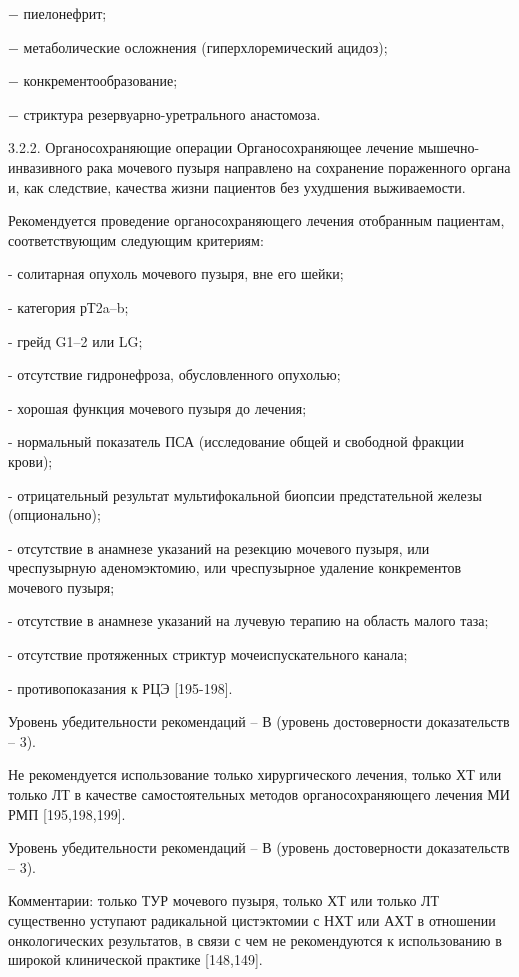 − пиелонефрит;

− метаболические осложнения (гиперхлоремический ацидоз);

− конкрементообразование;

− стриктура резервуарно-уретрального анастомоза.

3.2.2. Органосохраняющие операции
Органосохраняющее лечение мышечно-инвазивного рака мочевого пузыря направлено на сохранение пораженного органа и, как следствие, качества жизни пациентов без ухудшения выживаемости.

Рекомендуется проведение органосохраняющего лечения отобранным пациентам, соответствующим следующим критериям:

- солитарная опухоль мочевого пузыря, вне его шейки;

- категория рТ2a–b;

- грейд G1–2 или LG;

- отсутствие гидронефроза, обусловленного опухолью;

- хорошая функция мочевого пузыря до лечения;

- нормальный показатель ПСА (исследование общей и свободной фракции крови);

- отрицательный результат мультифокальной биопсии предстательной железы (опционально);

- отсутствие в анамнезе указаний на резекцию мочевого пузыря, или чреспузырную аденомэктомию, или чреспузырное удаление конкрементов мочевого пузыря;

- отсутствие в анамнезе указаний на лучевую терапию на область малого таза;

- отсутствие протяженных стриктур мочеиспускательного канала;

- противопоказания к РЦЭ [195-198].

Уровень убедительности рекомендаций – В (уровень достоверности доказательств – 3).

Не рекомендуется использование только хирургического лечения, только ХТ или только ЛТ в качестве самостоятельных методов органосохраняющего лечения МИ РМП [195,198,199].

Уровень убедительности рекомендаций – В (уровень достоверности доказательств – 3).

Комментарии: только ТУР мочевого пузыря, только ХТ или только ЛТ существенно уступают радикальной цистэктомии с НХТ или АХТ в отношении онкологических результатов, в связи с чем не рекомендуются к использованию в широкой клинической практике [148,149].

